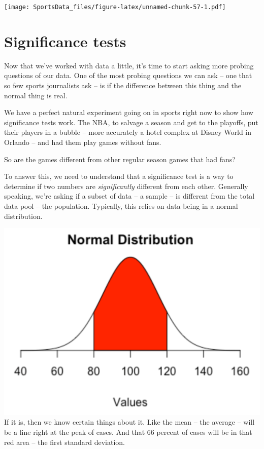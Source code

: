 \documentclass[
]{book}
\begin{document}
\texttt{[image: SportsData\_files/figure-latex/unnamed-chunk-57-1.pdf]}

\hypertarget{significance-tests}{%
\chapter{Significance tests}\label{significance-tests}}

Now that we've worked with data a little, it's time to start asking more probing questions of our data. One of the most probing questions we can ask -- one that so few sports journalists ask -- is if the difference between this thing and the normal thing is real.

We have a perfect natural experiment going on in sports right now to show how significance tests work. The NBA, to salvage a season and get to the playoffs, put their players in a bubble -- more accurately a hotel complex at Disney World in Orlando -- and had them play games without fans.

So are the games different from other regular season games that had fans?

To answer this, we need to understand that a significance test is a way to determine if two numbers are \emph{significantly} different from each other. Generally speaking, we're asking if a subset of data -- a sample -- is different from the total data pool -- the population. Typically, this relies on data being in a normal distribution.

\includegraphics[width=17.64in]{images/simulations2}
If it is, then we know certain things about it. Like the mean -- the average -- will be a line right at the peak of cases. And that 66 percent of cases will be in that red area -- the first standard deviation.
\end{document}
